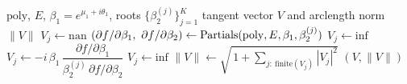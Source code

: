 
\begin{algorithm}
\caption{\textsc{ComputeTangents}$(\mathrm{poly},E,\beta_1,\{\beta_2^{(j)}\})$ —
analytic track tangents $V_j=\mathrm{d}\ln\beta_2^{(j)}/\mathrm{d}\theta_1$ by the implicit-function theorem.}
\label{alg:compute-tangent}
\begin{algorithmic}[1]
\Require $\mathrm{poly}$, $E$, $\beta_1=e^{\mu_1+i\theta_1}$, roots $\{\beta_2^{(j)}\}_{j=1}^{K}$
\Ensure tangent vector $V$ and arclength norm $\lVert V\rVert$
    \State $V_j\gets\mathrm{nan}$ 
  \Else
    \State $(\partial f/\partial\beta_1,\ \partial f/\partial\beta_2)\gets\mathrm{Partials}(\mathrm{poly},E,\beta_1,\beta_2^{(j)})$
      \State $V_j\gets\mathrm{inf}$ 
    \Else
      \State $V_j\gets -i\,\beta_1\,\dfrac{\partial f/\partial\beta_1}{\beta_2^{(j)}\,\partial f/\partial\beta_2}$
       \State $V_j\gets\mathrm{inf}$ \EndIf
    \EndIf
  \EndIf
\EndFor
\State $\lVert V\rVert\gets\sqrt{\,1+\sum_{j:\ \mathrm{finite}(V_j)}|V_j|^2}$ 
\State \Return $(V,\lVert V\rVert)$
\end{algorithmic}
\end{algorithm}

